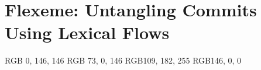\chapter{Flexeme: Untangling Commits Using Lexical Flows}
\label{chapter:flexeme}

\renewcommand{\algorithmicrequire}{\textbf{Input:}}
\renewcommand{\algorithmicensure}{\textbf{Output:}}


\newcommand{\ourapproach}{\textsc{flexeme}\xspace}
\newcommand{\Ourapproach}{\textsc{Flexeme}\xspace}
\renewcommand{\ourtool}{\textsc{heddle}\xspace}
\renewcommand{\Ourtool}{\textsc{Heddle}\xspace}
\newcommand{\projURL}{\url{https://github.com/PPPI/Flexeme}\xspace}

\newcommand{\Ouraccuracy}{$0.81$\xspace}
\newcommand{\Ouraccuracyhigh}{$0.84$\xspace}
\newcommand{\OuraccuracyhighProject}{Nancy\xspace}
\newcommand{\Ourspeedup}{$32$\xspace}
\newcommand{\OurslowdownBarnett}{$9$\xspace}
\newcommand{\Ourabsolutespeedup}{$3'10''$\xspace}
\newcommand{\Ourruntime}{ten seconds\xspace}
\newcommand{\OurtoolsAtomicAccuracy}{$0.63$\xspace}
\newcommand{\OurtoolsAtomicLabelAccuracy}{$0.93$\xspace}

\newcommand{\OurtoolVsHerzigAccuracy}{$0.14$\xspace}
\newcommand{\BarnettAccuracy}{$0.13$\xspace}
\newcommand{\HerzigConceptAccuracyDrop}{$0.07$\xspace}

\newcommand{\OurtoolsScalabilityRegression}{$t = 0.3371 - 0.0041 n + 0.0015 n^2$, $R^2=1.00$\xspace}
\newcommand{\HerzigScalabilityRegression}{$t = 0.8794 - 0.0528 n + 0.0019 n^2$, $R^2=0.99$\xspace}
\newcommand{\SpeedGainAtScale}{$68$ seconds\xspace}

\newcommand{\HerzigDeltaOurtoolAccuracy}{$p<0.001$\xspace}
\newcommand{\HerzigDeltaOurtoolTime}{$p=0.51$\xspace}
\newcommand{\BarnettConceptsAccuracy}{$p < 0.01$\xspace}
\newcommand{\HerzigConceptsAccuracy}{$p=0.28$\xspace}
\newcommand{\OurtoolConceptsAccuracy}{$p=0.76$\xspace}

\newcommand{\annequiv}{$\equiv_{a}$\xspace}
\newcommand{\nodeequiv}{$\equiv_{n}$\xspace}

\definecolor{cb-green-sea}  {RGB}{  0, 146, 146}
\definecolor{cb-purple}     {RGB}{ 73,   0, 146}
\definecolor{cb-blue-sky}   {RGB}{109, 182, 255}
\definecolor{cb-burgundy}   {RGB}{146,   0,   0}

